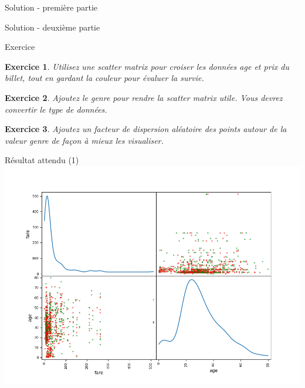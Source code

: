 \documentclass[11pt]{beamer}
\newtheorem{exercice}{Exercice}
\newcommand{\Python}[1]{
	{\small	}
}
\begin{document}
\begin{frame}{Solution - première partie}
\Python{ex203bis}
\end{frame}

\begin{frame}{Solution - deuxième partie}
\Python{ex204}
\end{frame}

\begin{frame}{Exercice}
\begin{exercice}
Utilisez une scatter matrix pour croiser les données age et prix du billet, tout en gardant la couleur pour évaluer la survie.
\end{exercice}
\begin{exercice}
Ajoutez le genre pour rendre la scatter matrix utile. Vous devrez convertir le type de données.
\end{exercice}
\begin{exercice}
Ajoutez un facteur de dispersion aléatoire des points autour de la valeur genre de façon à mieux les visualiser.
\end{exercice}
\end{frame}

\begin{frame}{Résultat attendu (1)}
\includegraphics[scale=0.42]{ex205}
\end{frame}
\end{document}

